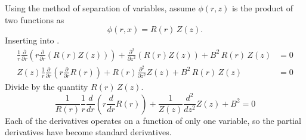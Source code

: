  Using the method of separation of variables, assume $\phi(r,z)$ is the product
  of two functions as
  \begin{equation}
    \label{eq:finite_cyl_separation}
    \phi(r,x) = R(r) \, Z(z).
  \end{equation}
  Inserting  into .
  \begin{align}
    \frac{1}{r} \frac{\partial}{\partial r} \left( r \frac{\partial}{\partial r}
      \left(R(r) Z(z) \right) \right) + \frac{\partial^2}{\partial z^2} \left(
      R(r) Z(z) \right) + B^2 \,R(r) \, Z(z) &= 0 \\
    Z(z) \frac{1}{r} \frac{\partial}{\partial r} \left( r
    \frac{\partial}{\partial r} R(r) \right) + R(r) \frac{\partial^2}{\partial
    z^2} Z(z) + B^2 \, R(r) \, Z(z) &= 0
  \end{align}
  Divide by the quantity $R(r)\,Z(z)$.
  \begin{equation}
    \label{eq:finite_cyl_sum}
    \frac{1}{R(r)} \frac{1}{r} \frac{d}{d r} \left( r
    \frac{d}{d r} R(r) \right) + \frac{1}{Z(z)}
    \frac{d^2}{d z^2} Z(z) + B^2 = 0
  \end{equation}
  Each of the derivatives operates on a function of only one variable, so the
  partial derivatives have become standard derivatives.

